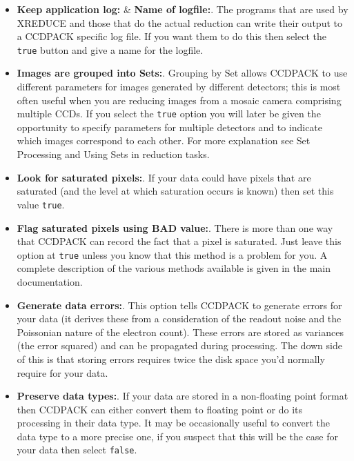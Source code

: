 \documentclass[11pt]{article}
\newcommand{\xref}[3]{#1}
\newcommand{\wlab}[1]{{\bf #1}}
\newcommand{\text}[1]{{\tt #1}}
\begin{document}
\begin{itemize}
\item \wlab{Keep application log:} \& \wlab{Name of logfile:}.
The programs that are used by XREDUCE and those that do the actual
reduction can write their output to a CCDPACK specific log file. If
you want them to do this then select the \text{true} button and give
a name for the logfile.

\item \wlab{Images are grouped into Sets:}.
Grouping by Set allows CCDPACK to use different parameters for images 
generated by different detectors; this is most often useful when
you are reducing images from a mosaic camera comprising multiple CCDs.
If you select the \text{true} option you will later be given the opportunity
to specify parameters for multiple detectors and to
indicate which images correspond to each other.
For more explanation see \xref{Set Processing}{sun139}{ccdpack_sets}
and \xref{Using Sets in reduction tasks}{sun139}{setreduce}.

\item \wlab{Look for saturated pixels:}. If your data could have pixels
that are saturated (and the level at which saturation occurs is known)
then set this value \text{true}.

\item \wlab{Flag saturated pixels using BAD value:}. There is more than
one way that CCDPACK can record the fact that a pixel is saturated.
Just leave this option at \text{true} unless you know that this method
is a problem for you.  A \xref{complete description}{sun139}{CCDsaturate}
of the various methods available is given in the main documentation.


\item \wlab{Generate data errors:}. This option tells CCDPACK to
generate errors for your data (it derives these from a consideration
of the readout noise and the Poissonian nature of the electron count).
These errors are stored as variances (the error squared) and can be
propagated during processing.  The down side of this is that storing
errors requires twice the disk space you'd normally require for your
data.

\item \wlab{Preserve data types:}. If your data are stored in a
non-floating point format then CCDPACK can either convert them to
floating point or do its processing in their data type. It may be
occasionally useful to convert the data type to a more precise one, if
you suspect that this will be the case for your data then select
\text{false}.

\end{itemize}
\end{document}
